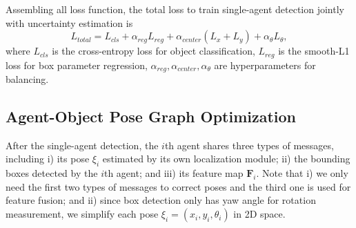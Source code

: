 \documentclass[letterpaper, 10 pt, conference]{ieeeconf}  %
\begin{document}

Assembling all loss function, the total loss to train single-agent detection jointly with uncertainty estimation is
\begin{equation*}
    L_{total} = L_{cls} + \alpha_{reg} L_{reg} + \alpha_{center} (L_{x} + L_{y}) + \alpha_{\theta} L_{\theta},
\end{equation*}
where $L_{cls}$ is the cross-entropy loss for object classification, $L_{reg}$ is the smooth-L1 loss for box parameter regression, $\alpha_{reg}, \alpha_{center}, \alpha_{\theta}$ are hyperparameters for balancing.





\subsection{Agent-Object Pose Graph Optimization} 
\label{sec:correction}
After the single-agent detection, the $i$th agent shares three types of messages, including i) its pose $\xi_i$ estimated by its own localization module; ii) the bounding boxes detected by the $i$th agent; and iii) its feature map $\mathbf{F}_i$. Note that i) we only need the first two types of messages to correct poses and the third one is used for feature fusion; and ii) since box detection only has yaw angle for rotation measurement, we simplify each pose $\xi_i =(x_i, y_i, \theta_i)$ in 2D space.
\end{document}
